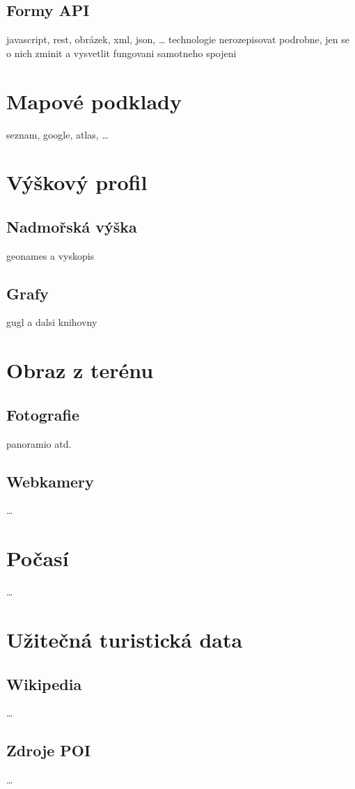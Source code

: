 \subsection{Formy API}
javascript, rest, obrázek, xml, json, \ldots
technologie nerozepisovat podrobne, jen se o nich zminit a vysvetlit
fungovani samotneho spojeni

\section{Mapové podklady}
seznam, google, atlas, \ldots

\section{Výškový profil}
\subsection{Nadmořská výška}
geonames a vyskopis
\subsection{Grafy}
gugl a dalsi knihovny

\section{Obraz z terénu}
\subsection{Fotografie}
panoramio atd.
\subsection{Webkamery}
\ldots

\section{Počasí}
\ldots

\section{Užitečná turistická data}
\subsection{Wikipedia}
\ldots
\subsection{Zdroje POI}
\ldots
